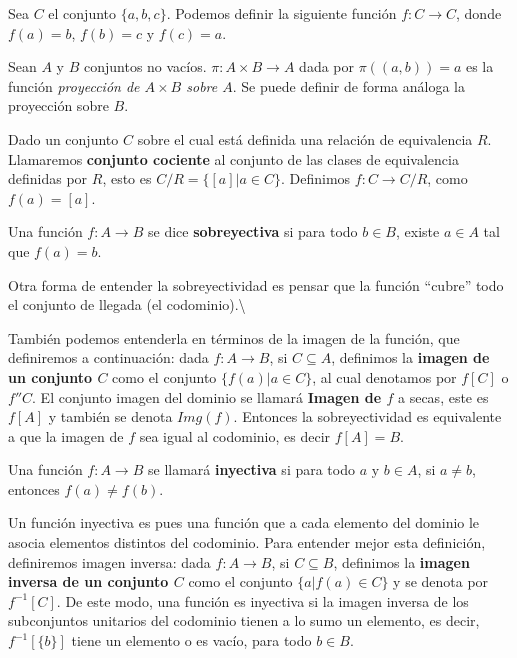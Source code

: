 \documentclass[12pt,]{krantz}
\theoremstyle{definition}
\theoremstyle{definition}
\theoremstyle{definition}
\theoremstyle{remark}
\let\BeginKnitrBlock\begin \let\EndKnitrBlock\end
\begin{document}
\BeginKnitrBlock{example}
\protect\hypertarget{exm:ejm1-16}{}{\label{exm:ejm1-16} }Sea \(C\) el
conjunto \(\{a,b,c\}\). Podemos definir la siguiente función
\(f:C\longrightarrow C\), donde \(f(a)=b\), \(f(b)=c\) y \(f(c)=a\).
\EndKnitrBlock{example}

\BeginKnitrBlock{example}
\protect\hypertarget{exm:ejm1-17}{}{\label{exm:ejm1-17} }Sean \(A\) y \(B\)
conjuntos no vacíos. \(\pi: A\times B\longrightarrow A\) dada por
\(\pi((a,b))=a\) es la función
\textit{proyección de $A\times B$ sobre $A$}. Se puede definir de forma
análoga la proyección sobre \(B\).
\EndKnitrBlock{example}

\BeginKnitrBlock{example}
\protect\hypertarget{exm:ejm1-18}{}{\label{exm:ejm1-18} }Dado un conjunto
\(C\) sobre el cual está definida una relación de equivalencia \(R\).
Llamaremos \textbf{conjunto cociente} al conjunto de las clases de
equivalencia definidas por \(R\), esto es \(C/R=\{[a] | a\in C \}\).
Definimos \(f:C\longrightarrow C/R\), como \(f(a)=[a]\).
\EndKnitrBlock{example}

\BeginKnitrBlock{definition}
\protect\hypertarget{def:unnamed-chunk-32}{}{\label{def:unnamed-chunk-32}
}Una función \(f:A\longrightarrow B\) se dice \textbf{sobreyectiva} si
para todo \(b\in B\), existe \(a\in A\) tal que \(f(a)=b\).
\EndKnitrBlock{definition}

Otra forma de entender la sobreyectividad es pensar que la función
``cubre'' todo el conjunto de llegada (el codominio).\textbackslash{}

También podemos entenderla en términos de la imagen de la función, que
definiremos a continuación: dada \(f:A\longrightarrow B\), si
\(C\subseteq A\), definimos la \textbf{imagen de un conjunto \(C\)} como
el conjunto \(\{f(a) | a\in C \}\), al cual denotamos por \(f[C]\) o
\(f''C\). El conjunto imagen del dominio se llamará \textbf{Imagen de
\(f\)} a secas, este es \(f[A]\) y también se denota \(Img(f)\).
Entonces la sobreyectividad es equivalente a que la imagen de \(f\) sea
igual al codominio, es decir \(f[A]=B\).

\BeginKnitrBlock{definition}
\protect\hypertarget{def:unnamed-chunk-33}{}{\label{def:unnamed-chunk-33}
}Una función \(f:A\longrightarrow B\) se llamará \textbf{inyectiva} si
para todo \(a\mbox{ y }b\in A\), si \(a\neq b\), entonces
\(f(a)\neq f(b)\).
\EndKnitrBlock{definition}

Un función inyectiva es pues una función que a cada elemento del dominio
le asocia elementos distintos del codominio. Para entender mejor esta
definición, definiremos imagen inversa: dada \(f:A\longrightarrow B\),
si \(C\subseteq B\), definimos la \textbf{imagen inversa de un conjunto
\(C\)} como el conjunto \(\{a | f(a)\in C \}\) y se denota por
\(f^{-1}[C]\). De este modo, una función es inyectiva si la imagen
inversa de los subconjuntos unitarios del codominio tienen a lo sumo un
elemento, es decir, \(f^{-1}[\{b\}]\) tiene un elemento o es vacío, para
todo \(b\in B\).
\end{document}
